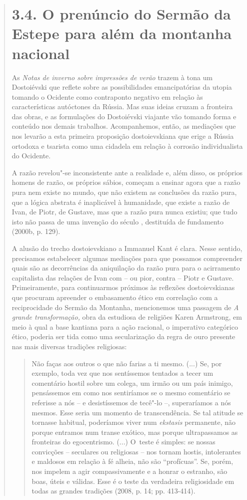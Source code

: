 {\begin{quote}
\section{3.4. O prenúncio do Sermão da Estepe para além da montanha
nacional}

As \emph{Notas de inverno sobre impressões de verão} trazem à tona um
Dostoiévski que reflete sobre as possibilidades emancipatórias da utopia
tomando o Ocidente como contraponto negativo em relação às
características autóctones da Rússia. Mas suas ideias cruzam a fronteira
das obras, e as formulações do Dostoiévski viajante vão tomando forma e
conteúdo nos demais trabalhos. Acompanhemos, então, as mediações que nos
levarão a esta primeira proposição dostoievskiana que erige a Rússia
ortodoxa e tsarista como uma cidadela em relação à corrosão
individualista do Ocidente.

A razão revelou"-se inconsistente ante a realidade e, além disso, os
próprios homens de razão, os próprios sábios, começam a ensinar agora
que a razão pura nem existe no mundo, que não existem as conclusões da
razão pura, que a lógica abstrata é inaplicável à humanidade, que existe
a razão de Ivan, de Piotr, de Gustave, mas que a razão pura nunca
existiu; que tudo isto não passa de uma invenção do século ,
destituída de fundamento (2000b, p. 129).

A alusão do trecho dostoievskiano a Immanuel Kant é clara. Nesse
sentido, precisamos estabelecer algumas mediações para que possamos
compreender quais são as decorrências da aniquilação da razão pura para
o acirramento capitalista das relações de Ivan com -- ou pior, contra --
Piotr e Gustave. Primeiramente, para continuarmos próximos às reflexões
dostoievskianas que procuram apreender o embasamento ético em correlação
com a reciprocidade do Sermão da Montanha, mencionemos uma passagem de
\emph{A grande transformação,} obra da estudiosa de religiões Karen
Armstrong, em meio à qual a base kantiana para a ação racional, o
imperativo categórico ético, poderia ser tida como uma secularização da
regra de ouro presente nas mais diversas tradições religiosas:

\begin{quote}
Não faças aos outros o que não farias a ti mesmo. (...) Se, por exemplo,
toda vez que nos sentíssemos tentados a tecer um comentário hostil sobre
um colega, um irmão ou um país inimigo, pensássemos em como nos
sentiríamos se o mesmo comentário se referisse a nós -- e desistíssemos
de tecê"-lo --, superaríamos a nós mesmos. Esse seria um momento de
transcendência. Se tal atitude se tornasse habitual, poderíamos viver
num \emph{ekstasis} permanente, não porque entramos num transe exótico,
mas porque ultrapassamos as fronteiras do egocentrismo. (...) O~teste é
simples: se nossas convicções -- seculares ou religiosas -- nos tornam
hostis, intolerantes e maldosos em relação à fé alheia, não são
``profícuas''. Se, porém, nos impelem a agir compassivamente e a honrar
o estranho, são boas, úteis e válidas. Esse é o teste da verdadeira
religiosidade em todas as grandes tradições (2008, p. 14; pp. 413-414).
\end{quote}


\end{quote}}
